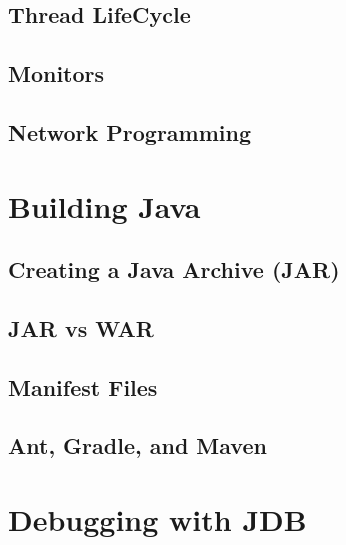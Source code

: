 \documentclass{article}
\begin{document}
\subsection{Thread LifeCycle}

\subsection{Monitors}

\subsection{Network Programming}

\section{Building Java}

\subsection{Creating a Java Archive (JAR)}

\subsection{JAR vs WAR}

\subsection{Manifest Files}

\subsection{Ant, Gradle, and Maven}

\section{Debugging with JDB}
\end{document}
